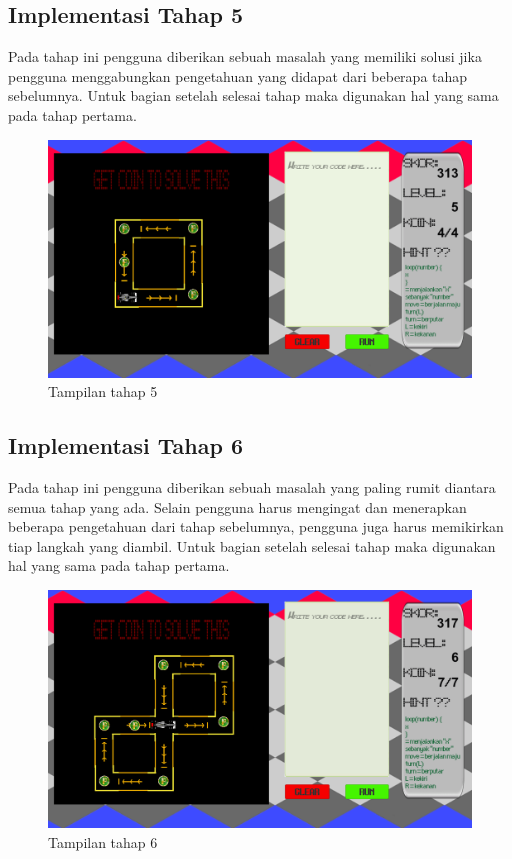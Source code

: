 	\subsection{Implementasi Tahap 5}
	Pada tahap ini pengguna diberikan sebuah masalah yang memiliki solusi jika pengguna menggabungkan pengetahuan yang didapat dari beberapa tahap sebelumnya. Untuk bagian setelah selesai tahap maka digunakan hal yang sama pada tahap pertama.
	\begin{figure}
		\centering
		\includegraphics[width=\linewidth-40pt]{pics/prototipe/tahap5}
		\caption{Tampilan tahap 5}
	\end{figure}
	\subsection{Implementasi Tahap 6}
	Pada tahap ini pengguna diberikan sebuah masalah yang paling rumit diantara semua tahap yang ada. Selain pengguna harus mengingat dan menerapkan beberapa pengetahuan dari tahap sebelumnya, pengguna juga harus memikirkan tiap langkah yang diambil. Untuk bagian setelah selesai tahap maka digunakan hal yang sama pada tahap pertama.
	\begin{figure}
		\centering						
		\includegraphics[width=\linewidth-40pt]{pics/prototipe/tahap6}
		\caption{Tampilan tahap 6}
		
	\end{figure}
